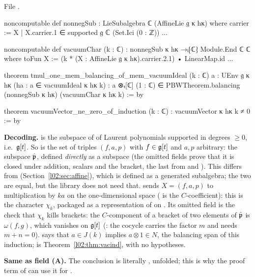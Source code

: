File .
\begin{leancode}
noncomputable def nonnegSub : LieSubalgebra ℂ (AffineLie 𝔤 κ hκ) where
  carrier := {X | X.carrier.1 ∈ supported 𝔤 ℂ (Set.Ici (0 : ℤ))}
  ...

noncomputable def vacuumChar (k : ℂ) : nonnegSub κ hκ →ₗ⁅ℂ⁆ Module.End ℂ ℂ where
  toFun X := (k * (X : AffineLie 𝔤 κ hκ).carrier.2.1) • LinearMap.id
  ...

theorem tmul_one_mem_balancing_of_mem_vacuumIdeal (k : ℂ) {a : UEnv 𝔤 κ hκ}
    (ha : a ∈ vacuumIdeal κ hκ k) :
    a ⊗ₜ[ℂ] (1 : ℂ) ∈ PBWTheorem.balancing (nonnegSub κ hκ) (vacuumChar κ hκ k) := by

theorem vacuumVector_ne_zero_of_induction (k : ℂ) : vacuumVector κ hκ k ≠ 0 := by
\end{leancode}

\begin{dictionary}
\textbf{Decoding.}  is the subspace of  of Laurent
polynomials supported in degrees $\ge0$, i.e.\ $\mathfrak{g}[t]$. So  is the set of triples
$(f,a,p)$ with $f\in\mathfrak{g}[t]$ and $a,p$ arbitrary: the subspace $\hat{\mathfrak{p}}$, defined \emph{directly} as a
subspace (the omitted fields prove that it is closed under addition, scalars and the bracket, the last
from \allowbreak{}\allowbreak{} and \allowbreak{}\allowbreak{}). This differs from 
(Section~\ref{l02:sec:affine}), which is defined as a generated subalgebra; the two are equal, but the
library does not need that.  sends $X = (f,a,p)$ to multiplication by $ka$ on the
one-dimensional space  ( is the $C$-coefficient): this is the character $\chi_k$,
packaged as a representation of  on . Its omitted field  is the check
that $\chi_k$ kills brackets: the $C$-component of a bracket of two elements of $\hat{\mathfrak{p}}$ is
$\omega(f,g)$, which vanishes on $\mathfrak{g}[t]$ (: the cocycle carries the factor $m$ and needs
$m + n = 0$).  says that $a\in J(k)$ implies
$a\otimes1\in N$, the balancing span of this induction;  is
Theorem~\ref{l02:thm:vacind}, with no hypotheses.

\textbf{Same as field (A).} The conclusion is literally , unfolded; this is why the proof
term of  can use it for .
\end{dictionary}

